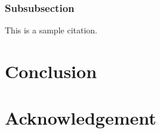 \documentclass[10pt,aps,pre,raggedfooter,twocolumn,twoside,longbibliography,floatfix,superscriptaddress]{revtex4-1}
\begin{document}
\subsubsection{Subsubsection} \label{sec:content}
\blindtext
\blindtext
This is a sample citation\cite{rudnick1986jp}.
\blindtext

\section{Conclusion}
\blindtext
\blindtext
\blindtext

\section{Acknowledgement}
\blindtext

\end{document}
